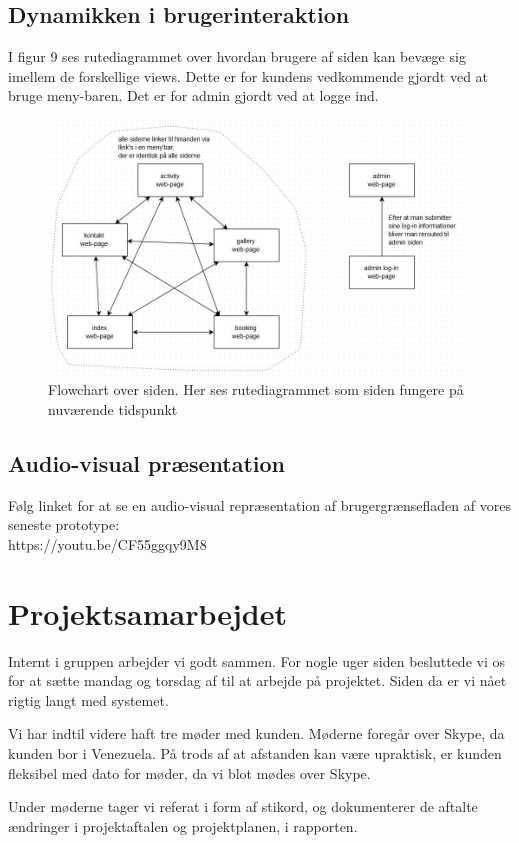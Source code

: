 \documentclass[12pt,a4paper]{article}
\begin{document}
\subsection{Dynamikken i brugerinteraktion}
I figur 9 ses rutediagrammet over 
hvordan brugere af siden kan bevæge sig imellem de forskellige views. 
Dette er for kundens vedkommende gjordt ved at bruge meny-baren.
Det er for admin gjordt ved at logge ind.
\begin{figure}[H]
\centering
\includegraphics[scale=0.6] {flowchart.jpg}
\caption{Flowchart over siden. Her ses rutediagrammet som siden fungere på nuværende tidspunkt}
\end{figure}
\newpage
\subsection{Audio-visual præsentation}
Følg linket for at se en audio-visual repræsentation af brugergrænsefladen af vores seneste prototype:\\
https://youtu.be/CF55ggqy9M8
\section{Projektsamarbejdet}
Internt i gruppen arbejder vi godt sammen. For nogle uger siden besluttede vi os for at sætte mandag og torsdag af til at arbejde på projektet. Siden da er vi nået rigtig langt med systemet. 

Vi har indtil videre haft tre møder med kunden. Møderne foregår over Skype, da kunden bor i Venezuela. På trods af at afstanden kan være upraktisk, er kunden fleksibel med dato for møder, da vi blot mødes over Skype.

Under møderne tager vi referat i form af stikord, og dokumenterer de aftalte ændringer i projektaftalen og projektplanen, i rapporten. 
\newpage
\end{document}

